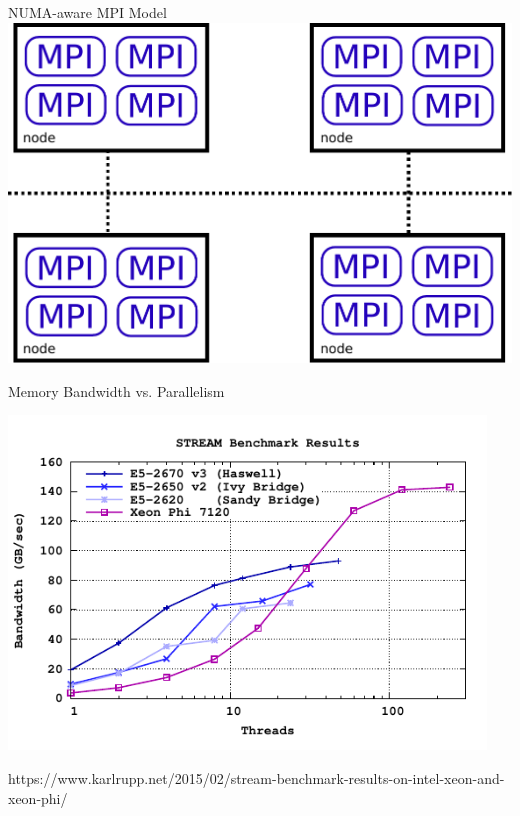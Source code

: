 

\begin{frame}{NUMA-aware MPI Model}
  \includegraphics[width=1.0\textwidth]{figures/numa-mpi}
\end{frame}





\begin{frame}[fragile]{Memory Bandwidth vs. Parallelism}
 \begin{center}
  \includegraphics[width=0.95\textwidth]{figures/stream}
 \end{center}
 {\scriptsize https://www.karlrupp.net/2015/02/stream-benchmark-results-on-intel-xeon-and-xeon-phi/ }
\end{frame}



